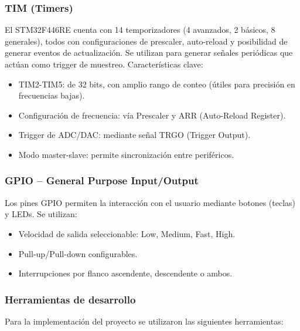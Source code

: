 \documentclass[12pt]{article}
\begin{document}
	\subsubsection{TIM (Timers)}
	El STM32F446RE cuenta con 14 temporizadores (4 avanzados, 2 básicos, 8 generales), todos con configuraciones de prescaler, auto-reload y posibilidad de generar eventos de actualización. Se utilizan para generar señales periódicas que actúan como trigger de muestreo. Características clave:
	\begin{itemize}
		\item TIM2-TIM5: de 32 bits, con amplio rango de conteo (útiles para precisión en frecuencias bajas).
		
		\item Configuración de frecuencia: vía Prescaler y ARR (Auto-Reload Register).
		
		\item Trigger de ADC/DAC: mediante señal TRGO (Trigger Output).
		
		\item Modo master-slave: permite sincronización entre periféricos.
	\end{itemize}
	
	\subsubsection{GPIO – General Purpose Input/Output}
	Los pines GPIO permiten la interacción con el usuario mediante botones (teclas) y LEDs. Se utilizan:
	
	\begin{itemize}
		\item Velocidad de salida seleccionable: Low, Medium, Fast, High.
		
		\item Pull-up/Pull-down configurables.
		
		\item Interrupciones por flanco ascendente, descendente o ambos.
	\end{itemize}
	
		\subsubsection{Herramientas de desarrollo}
	Para la implementación del proyecto se utilizaron las siguientes herramientas:
	
\end{document}
